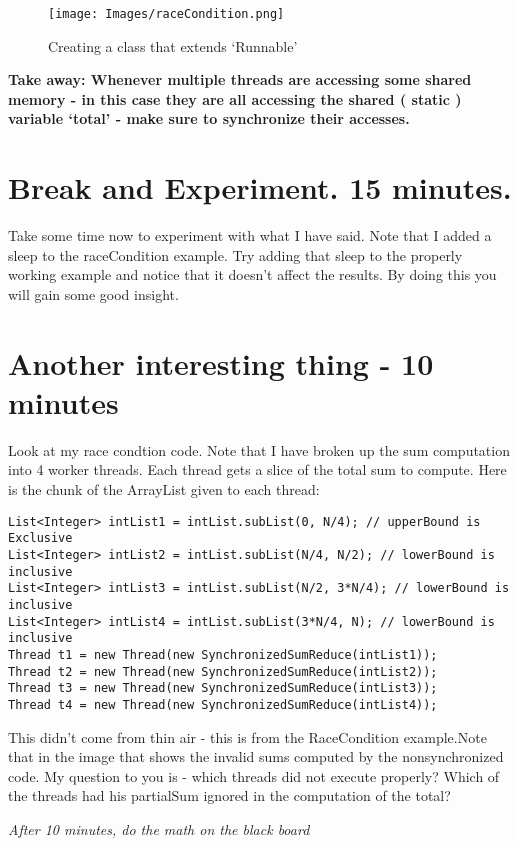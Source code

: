 \documentclass[12pt]{article}
\begin{document}
\begin{figure}[ht]
  \label{raceCondition}
  \centering
    \texttt{[image: Images/raceCondition.png]}
  \caption{Creating a class that extends `Runnable'}
\end{figure}

{\Large\textbf{Take away: Whenever multiple threads are accessing some shared
memory - in this case they are all accessing the shared ( static ) variable
`total' - make sure to  synchronize their accesses.}}

\section{Break and Experiment. 15 minutes.}
Take some time now to experiment with what I have said. Note that I added a
sleep to the raceCondition example. Try adding that sleep to the properly
working example and notice that it doesn't affect the results. By doing this you
will gain some good insight.

\section{ Another interesting thing - 10 minutes }
Look at my race condtion code. Note that I have broken up the sum computation
into 4 worker threads. Each thread gets a slice of the total sum to compute.
Here is the chunk of the ArrayList given to each thread:

\begin{lstlisting}
List<Integer> intList1 = intList.subList(0, N/4); // upperBound is Exclusive
List<Integer> intList2 = intList.subList(N/4, N/2); // lowerBound is inclusive
List<Integer> intList3 = intList.subList(N/2, 3*N/4); // lowerBound is inclusive
List<Integer> intList4 = intList.subList(3*N/4, N); // lowerBound is inclusive
Thread t1 = new Thread(new SynchronizedSumReduce(intList1));	
Thread t2 = new Thread(new SynchronizedSumReduce(intList2));
Thread t3 = new Thread(new SynchronizedSumReduce(intList3));
Thread t4 = new Thread(new SynchronizedSumReduce(intList4));
\end{lstlisting}

This didn't come from thin air - this is from the RaceCondition example.Note
that in the image that shows the invalid sums computed by the nonsynchronized
code. My question to you is - which threads did not execute properly? Which of
the threads had his partialSum ignored in the computation of the total?

{\Large\textit{After 10 minutes, do the math on the black board}}
\end{document}
